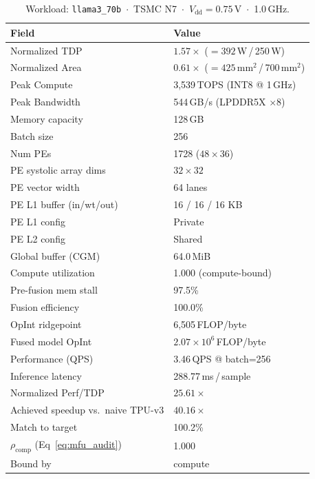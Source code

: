 \begin{table}[h]
\centering
\caption{Workload: \texttt{llama3\_70b}~$\cdot$~TSMC N7~$\cdot$~$V_\text{dd}=0.75$\,V~$\cdot$~1.0\,GHz.}
\label{tab:cheetah_v1_llama3_70b}
\small\setlength{\tabcolsep}{6pt}
\begin{tabular}{@{}ll@{}}
\toprule
\textbf{Field} & \textbf{Value} \\
\midrule
Normalized TDP          & $1.57\times$ ($= 392$\,W\,/\,250\,W) \\
Normalized Area         & $0.61\times$ ($= 425$\,mm$^2$\,/\,700\,mm$^2$) \\
Peak Compute            & 3{,}539\,TOPS (INT8 @ 1\,GHz) \\
Peak Bandwidth          & 544\,GB/s (LPDDR5X $\times$8) \\
Memory capacity         & 128\,GB \\
Batch size              & 256 \\
Num PEs                 & 1728 ($48 \times 36$) \\
PE systolic array dims  & $32 \times 32$ \\
PE vector width         & 64 lanes \\
PE L1 buffer (in/wt/out) & 16 / 16 / 16 KB \\
PE L1 config            & Private \\
PE L2 config            & Shared \\
Global buffer (CGM)     & 64.0\,MiB \\
\midrule
Compute utilization     & 1.000 (compute-bound) \\
Pre-fusion mem stall    & 97.5\% \\
Fusion efficiency       & 100.0\% \\
OpInt ridgepoint        & 6{,}505\,FLOP/byte \\
Fused model OpInt       & $2.07 \times 10^{6}$\,FLOP/byte \\
Performance (QPS)       & 3.46\,QPS @ batch=256 \\
Inference latency       & 288.77\,ms\,/\,sample \\
Normalized Perf/TDP     & $25.61\times$ \\
Achieved speedup vs.\ naive TPU-v3 & $40.16\times$ \\
Match to target         & 100.2\% \\
$\rho_{\mathrm{comp}}$ (Eq~\ref{eq:mfu_audit}) & 1.000 \\
Bound by                & compute \\

\end{tabular}
\end{table}
